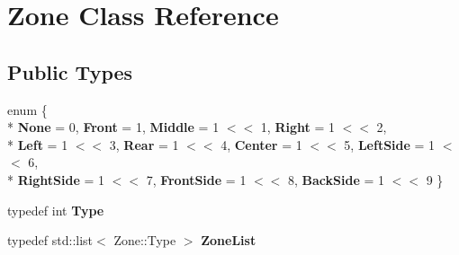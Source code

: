 \hypertarget{classZone}{\section{Zone Class Reference}
\label{classZone}
}
\subsection*{Public Types}
\begin{DoxyCompactItemize}
\item 
enum \{ \\*
{\bfseries None} = 0, 
{\bfseries Front} = 1, 
{\bfseries Middle} = 1 $<$$<$ 1, 
{\bfseries Right} = 1 $<$$<$ 2, 
\\*
{\bfseries Left} = 1 $<$$<$ 3, 
{\bfseries Rear} = 1 $<$$<$ 4, 
{\bfseries Center} = 1 $<$$<$ 5, 
{\bfseries Left\-Side} = 1 $<$$<$ 6, 
\\*
{\bfseries Right\-Side} = 1 $<$$<$ 7, 
{\bfseries Front\-Side} = 1 $<$$<$ 8, 
{\bfseries Back\-Side} = 1 $<$$<$ 9
 \}
\item 
\hypertarget{classZone_aed09846f4b80c8f6eb07546a097e75df}{typedef int {\bfseries Type}}\label{classZone_aed09846f4b80c8f6eb07546a097e75df}

\item 
\hypertarget{classZone_a292e482a040da4501b291fd913244764}{typedef std\-::list$<$ Zone\-::\-Type $>$ {\bfseries Zone\-List}}\label{classZone_a292e482a040da4501b291fd913244764}

\end{DoxyCompactItemize}
